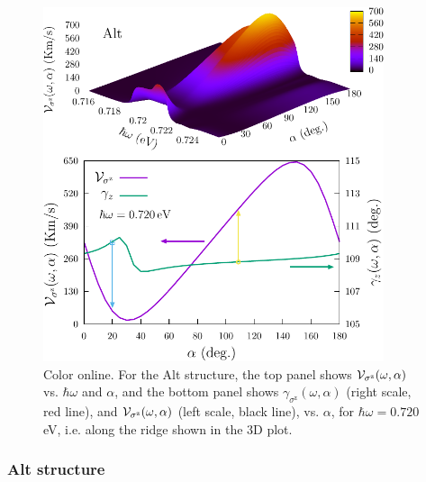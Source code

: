 \documentclass[floatfix,prb,aps,superscriptaddress,showpacs,11pt,preprint,letterpaper]{revtex4}
\def\tama{10cm}
\begin{document}
\begin{figure}[tb]
\centering
\includegraphics[width=\tama]{figures/fig6}
\caption{Color online. For the Alt structure, the top panel shows ${\cal
V}_{\sigma^\mathrm{z}} (\omega,\alpha)$ vs. $\hbar\omega$ and $\alpha$, and the
bottom panel shows $\gamma_{\sigma^\mathrm{z}} (\omega,\alpha)$ (right scale,
red line), and ${\cal V}_{\sigma^\mathrm{z}} (\omega,\alpha)$ (left scale,
black line), vs. $\alpha$, for $\hbar\omega=0.720$\,eV, i.e. along the ridge
shown in the 3D plot.}
\label{fig:alt-vsz}
\end{figure}

\subsubsection{Alt structure}
\end{document}
